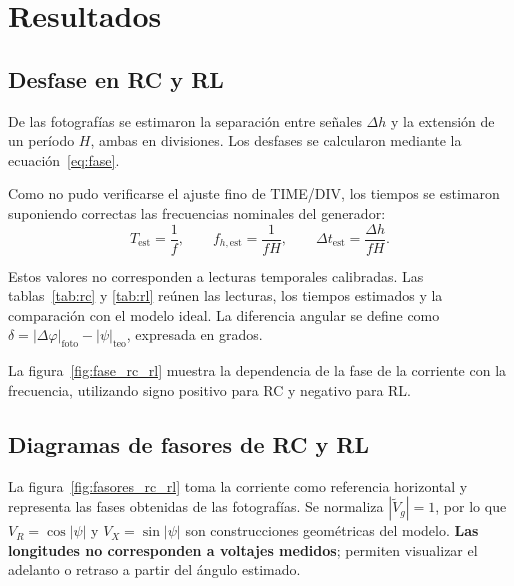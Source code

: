 \documentclass[10pt,letterpaper]{article}
\begin{document}
\section{Resultados}
\subsection{Desfase en RC y RL}

De las fotografías se estimaron la separación entre señales $\Delta h$ y la extensión de un período $H$, ambas en divisiones. Los desfases se calcularon mediante la ecuación~\eqref{eq:fase}.

Como no pudo verificarse el ajuste fino de TIME/DIV, los tiempos se estimaron suponiendo correctas las frecuencias nominales del generador:
\begin{equation}
  T_{\mathrm{est}}=\frac{1}{f},\qquad
  f_{h,\mathrm{est}}=\frac{1}{fH},\qquad
  \Delta t_{\mathrm{est}}=\frac{\Delta h}{fH}.
  \label{eq:reconstruccion}
\end{equation}

Estos valores no corresponden a lecturas temporales calibradas. Las tablas~\ref{tab:rc} y \ref{tab:rl} reúnen las lecturas, los tiempos estimados y la comparación con el modelo ideal. La diferencia angular se define como $\delta=|\Delta\varphi|_{\mathrm{foto}}-|\psi|_{\mathrm{teo}}$, expresada en grados.




La figura~\ref{fig:fase_rc_rl} muestra la dependencia de la fase de la corriente con la frecuencia, utilizando signo positivo para RC y negativo para RL.

\begin{center}
 
 \label{fig:fase_rc_rl}
\end{center}


\subsection{Diagramas de fasores de RC y RL}
La figura~\ref{fig:fasores_rc_rl} toma la corriente como referencia horizontal y representa las fases obtenidas de las fotografías. Se normaliza $|\widetilde V_g|=1$, por lo que $V_R=\cos|\psi|$ y $V_X=\sin|\psi|$ son construcciones geométricas del modelo. \textbf{Las longitudes no corresponden a voltajes medidos}; permiten visualizar el adelanto o retraso a partir del ángulo estimado.
\begin{center}
 
 \label{fig:fasores_rc_rl}
\end{center}
\end{document}
